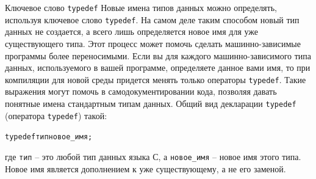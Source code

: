 \documentclass{beamer}
\begin{document}
\begin{frame}{Ключевое слово \texttt{typedef}}
    Новые имена типов данных можно определять, используя ключевое слово \texttt{typedef}. 
    \medskip
    На самом деле таким способом новый тип данных не создается, а всего лишь определяется новое имя для уже существующего типа. Этот процесс может помочь сделать машинно-зависимые программы более переносимыми. Если вы для каждого машинно-зависимого типа данных, используемого в вашей программе, определяете данное вами имя, то при
    компиляции для новой среды придется менять только операторы \texttt{typedef}.
    Такие выражения могут помочь в самодокументировании кода, позволяя давать понятные имена стандартным типам данных.
    Общий вид декларации \texttt{typedef} (оператора \texttt{typedef}) такой:
    
    \begin{alltt}
    typedef тип новое\_имя;
    \end{alltt}
    
    где \texttt{тип} – это любой тип данных языка С, а \texttt{новое\_имя} – новое имя этого типа. Новое имя является дополнением к уже существующему, а не его заменой.
\end{frame}
\end{document}
